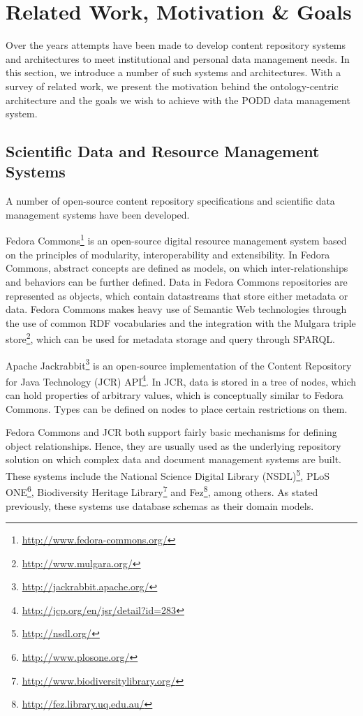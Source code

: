 \documentclass[conference,10pt]{IEEEtran}
\begin{document}
\section{Related Work, Motivation \& Goals}\label{sec:overview}
Over the years attempts have been made to develop content repository systems and architectures to meet institutional and personal data management needs. In this section, we introduce a number of such systems and architectures. With a survey of related work, we present the motivation behind the ontology-centric architecture and the goals we wish to achieve with the PODD data management system.

\subsection{Scientific Data and Resource Management Systems}
A number of open-source content repository specifications and scientific data management systems have been developed.

Fedora Commons\footnote{\url{http://www.fedora-commons.org/}} is an open-source digital resource management system based on the principles of modularity, interoperability and extensibility. In Fedora Commons, abstract concepts are defined as models, on which inter-relationships and behaviors can be further defined. Data in Fedora Commons repositories are represented as objects, which contain datastreams that store either metadata or data. Fedora Commons makes heavy use of Semantic Web technologies through the use of common RDF vocabularies and the integration with the Mulgara triple store\footnote{\url{http://www.mulgara.org/}}, which can be used for metadata storage and query through SPARQL. 

Apache Jackrabbit\footnote{\url{http://jackrabbit.apache.org/}} is an open-source implementation of the Content Repository for Java Technology (JCR) API\footnote{\url{http://jcp.org/en/jsr/detail?id=283}}. In JCR, data is stored in a tree of nodes, which can hold properties of arbitrary values, which is conceptually similar to Fedora Commons. Types can be defined on nodes to place certain restrictions on them.

Fedora Commons and JCR both support fairly basic mechanisms for defining object relationships. Hence, they are usually used as the underlying repository solution on which complex data and document management systems are built. These systems include the National Science Digital Library (NSDL)\footnote{\url{http://nsdl.org/}}, PLoS ONE\footnote{\url{http://www.plosone.org/}}, Biodiversity Heritage Library\footnote{\url{http://www.biodiversitylibrary.org/}} and Fez\footnote{\url{http://fez.library.uq.edu.au/}}, among others. As stated previously, these systems use database schemas as their domain models.
\end{document}
